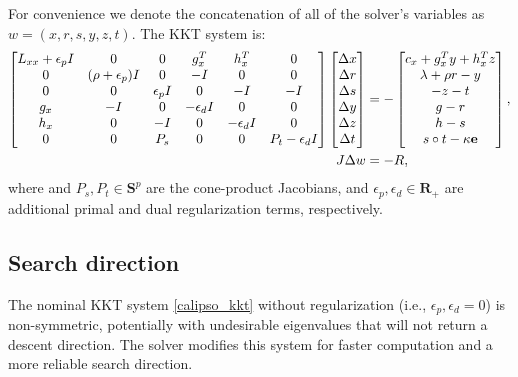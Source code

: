 For convenience we denote the concatenation of all of the solver's variables as $w = (x, r, s, y, z, t)$. The KKT system is:
\begin{align} 
	\begin{bmatrix} 
		L_{xx} + \epsilon_p I & 0      & 0 & g_x^T & h_x^T &  0 \\ 
		0      & (\rho + \epsilon_p) I & 0 &    -I &    0 &  0 \\ 
		0      & 0      & \epsilon_p I &    0 &   -I & -I \\ 
		g_x    & -I     & 0 &    -\epsilon_d I &    0 &  0 \\ 
		h_x    & 0      & -I & 0  & -\epsilon_d I & 0 \\
		0 & 0 & P_s & 0 & 0 & P_t - \epsilon_d I
	\end{bmatrix}
	\begin{bmatrix}
		\Delta x \\ 
		\Delta r \\ 
		\Delta s \\ 
		\Delta y \\ 
		\Delta z \\ 
		\Delta t
	\end{bmatrix} \label{calipso_kkt}
	&= 
	- 
	\begin{bmatrix} 
		c_x + g_x^T y + h_x^T z \\ 
		\lambda + \rho r - y \\ 
		-z - t \\ 
		g - r \\ 
		h - s \\
		s \circ t - \kappa \mathbf{e}
	\end{bmatrix}, \notag \\
	J \Delta w &= - R,
\end{align}
where and $P_s, P_t \in \mathbf{S}^p$ are the cone-product Jacobians, and $\epsilon_p, \epsilon_d \in \mathbf{R}_+$ are additional primal and dual regularization terms, respectively.

\subsection{Search direction}
The nominal KKT system \eqref{calipso_kkt} without regularization (i.e., $\epsilon_p, \epsilon_d = 0$) is non-symmetric, potentially with undesirable eigenvalues that will not return a descent direction. The solver modifies this system for faster computation and a more reliable search direction.

